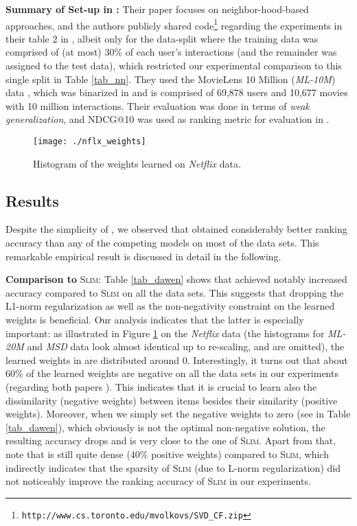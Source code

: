 \documentclass[sigconf]{acmart}
\newcommand{\slim}{{\scshape Slim}}
\newcommand{\sae}{}
\begin{document}
{\bf Summary of Set-up in \cite{volkovs15}:} Their paper focuses on neighbor-hood-based approaches, and
the authors publicly shared code\footnote{{\tt http://www.cs.toronto.edu/mvolkovs/SVD\_CF.zip}} regarding the experiments in their table 2 in \cite{volkovs15}, albeit only for the data-split where the training data  was comprised of (at most) 30\% of each user's interactions (and the remainder was assigned to the  test data), which restricted our experimental comparison to this single split in  Table \ref{tab_nn}.
 They used the  MovieLens 10 Million (\emph{ML-10M}) data \cite{movielens20mio}, which was binarized in \cite{volkovs15} and is comprised of 
69,878 users and 
10,677 movies with 10 million interactions.  Their evaluation was done in terms of \emph{weak generalization}, and NDCG@10  was used as ranking metric for evaluation in \cite{volkovs15}. 




\begin{figure}[t]
\begin{center}
\texttt{[image: ./nflx\_weights]}
\end{center}
\caption{Histogram of the weights learned on \emph{Netflix} data.}
\label{fig_weights}
\end{figure}

\subsection{Results}
Despite the    simplicity of \sae{}, we observed that \sae{}  obtained considerably better ranking accuracy than any of the competing models on most of the  data sets. This remarkable empirical result is discussed in detail in the following.
  

{\bf Comparison to} \slim{}:  Table \ref{tab_dawen} shows that \sae{}  achieved notably increased accuracy compared to \slim{} on all the data sets. This suggests that dropping the L1-norm regularization as well as the non-negativity constraint on the learned weights is beneficial. Our analysis indicates that the latter is especially important: as illustrated in Figure \ref{fig_weights} on the \emph{Netflix} data (the histograms for \emph{ML-20M} and \emph{MSD} data look almost identical up to re-scaling, and are omitted), the learned weights in \sae{}  are distributed around 0. Interestingly, it turns out that about 60\% of the learned weights are negative on all the data sets in our experiments (regarding both papers \cite{liang18,volkovs15}). This indicates that it is crucial  to learn also the dissimilarity (negative weights) between items besides their similarity (positive weights).
Moreover, when we simply set the negative weights to zero (see  \sae{} in Table \ref{tab_dawen}), which obviously is not the optimal non-negative solution, the resulting accuracy drops and is very close to the one of \slim{}.
Apart from that, note that \sae{} is still quite dense (40\% positive weights) compared to \slim{}, which indirectly indicates that the sparsity of \slim{} (due to L-norm regularization) did not noticeably improve the ranking accuracy of \slim{} in our experiments.
\end{document}
